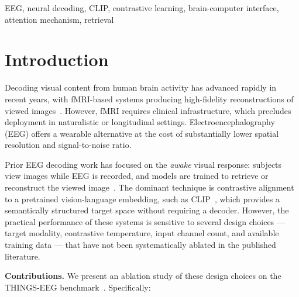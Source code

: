 \documentclass[conference]{IEEEtran}
\begin{document}
\begin{IEEEkeywords}
EEG, neural decoding, CLIP, contrastive
learning, brain-computer interface,
attention mechanism, retrieval
\end{IEEEkeywords}

\section{Introduction}

Decoding visual content from human brain
activity has advanced rapidly in recent years,
with fMRI-based systems producing
high-fidelity reconstructions of viewed
images~\cite{takagi2023,mindvis2023}.
However, fMRI requires clinical
infrastructure, which precludes deployment
in naturalistic or longitudinal settings.
Electroencephalography (EEG) offers a
wearable alternative at the cost of
substantially lower spatial resolution and
signal-to-noise ratio.

Prior EEG decoding work has focused on the
\emph{awake} visual response: subjects view
images while EEG is recorded, and models are
trained to retrieve or reconstruct the viewed
image~\cite{scotti2023}. The dominant
technique is contrastive alignment to a
pretrained vision-language embedding, such
as CLIP~\cite{radford2021}, which provides
a semantically structured target space
without requiring a decoder. However, the
practical performance of these systems is
sensitive to several design choices ---
target modality, contrastive temperature,
input channel count, and available training
data --- that have not been systematically
ablated in the published literature.

\textbf{Contributions.}
We present an ablation study of these design
choices on the THINGS-EEG
benchmark~\cite{gifford2022}. Specifically:
\end{document}
